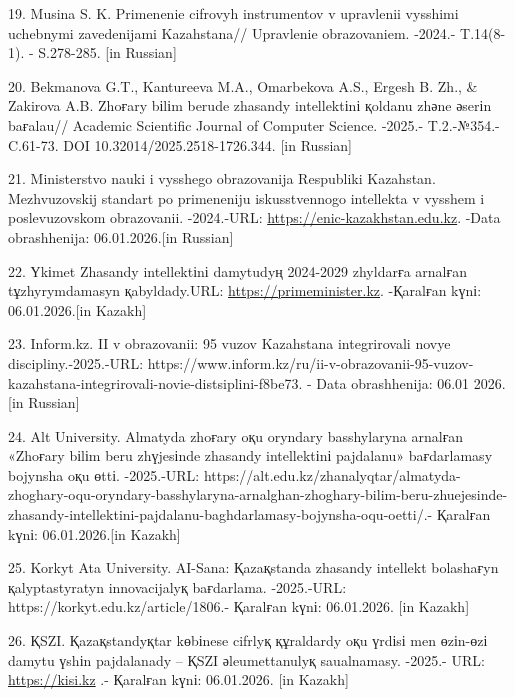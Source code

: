 \begin{refs}
19. Musina S. K. Primenenie cifrovyh instrumentov v upravlenii vysshimi
uchebnymi zavedenijami Kazahstana// Upravlenie obrazovaniem. -2024.-
T.14(8-1). - S.278-285. {[}in Russian{]}

20. Bekmanova G.T., Kantureeva M.A., Omarbekova A.S., Ergesh B. Zh., \&
Zakirova A.B. Zhoғary bіlіm berude zhasandy intellektіnі қoldanu zhәne
әserіn baғalau// Academic Scientific Journal of Computer Science.
-2025.- T.2.-№354.- C.61-73. DOI 10.32014/2025.2518-1726.344. {[}in
Russian{]}

21. Ministerstvo nauki i vysshego obrazovanija Respubliki Kazahstan.
Mezhvuzovskij standart po primeneniju iskusstvennogo intellekta v
vysshem i poslevuzovskom obrazovanii. -2024.-URL:
\href{https://enic-kazakhstan.edu.kz/files/1703569802/o-proekte-mezhvuzovskogo-standarta-po-primeneniyu-iskusstvennogo-intellekta.pdf}{https://enic-kazakhstan.edu.kz}.
-Data obrashhenija: 06.01.2026.{[}in Russian{]}

22. Үkіmet Zhasandy intellektіnі damytudyң 2024-2029 zhyldarғa arnalғan
tұzhyrymdamasyn қabyldady.URL:
\href{https://primeminister.kz/news/ukimet-zhasandy-intellektini-damytudyn-2024-2029-zhyldarga-arnalgan-tuzhyrymdamasyn-kabyldady-28786}{https://primeminister.kz}.
-Қaralғan kүnі: 06.01.2026.{[}in Kazakh{]}

23. Inform.kz. II v obrazovanii: 95 vuzov Kazahstana integrirovali novye
discipliny.-2025.-URL:
https://www.inform.kz/ru/ii-v-obrazovanii-95-vuzov-kazahstana-integrirovali-novie-distsiplini-f8be73.
- Data obrashhenija: 06.01 2026. {[}in Russian{]}

24. Alt University. Almatyda zhoғary oқu oryndary basshylaryna arnalғan
«Zhoғary bіlіm beru zhүjesіnde zhasandy intellektіnі pajdalanu»
baғdarlamasy bojynsha oқu өttі. -2025.-URL:
https://alt.edu.kz/zhanalyqtar/almatyda-zhoghary-oqu-oryndary-basshylaryna-arnalghan-zhoghary-bilim-beru-zhuejesinde-zhasandy-intellektini-pajdalanu-baghdarlamasy-bojynsha-oqu-oetti/.-
Қaralғan kүnі: 06.01.2026.{[}in Kazakh{]}

25. Korkyt Ata University. AI-Sana: Қazaқstanda zhasandy intellekt
bolashaғyn қalyptastyratyn innovacijalyқ baғdarlama. -2025.-URL:
https://korkyt.edu.kz/article/1806.- Қaralғan kүnі: 06.01.2026. {[}in
Kazakh{]}

26. ҚSZI. Қazaқstandyқtar kөbіnese cifrlyқ құraldardy oқu үrdіsі men
өzіn-өzі damytu үshіn pajdalanady -- ҚSZI әleumettanulyқ saualnamasy.
-2025.- URL:
\href{https://kisi.kz/kazakstandyktar-kobinese-chifrlyk-kuraldardy-oku-urdisi-men-ozin-ozi-damytu-ushin-pajdalanady-kszi-aleumettik-saualnamasy/}{https://kisi.kz} .-
Қaralғan kүnі: 06.01.2026. {[}in Kazakh{]}


\end{refs}
